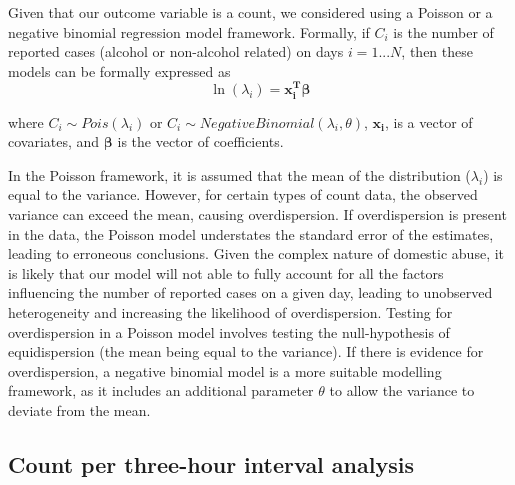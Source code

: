 \documentclass[12pt, a4paper]{article}
\newcommand{\vect}[1]{\boldsymbol{#1}}
\begin{document}
Given that our outcome variable is a count, we considered using a Poisson or a negative binomial regression model framework. 
Formally, if $C_i$ is the number of reported cases (alcohol or non-alcohol related) on days $i = 1...N$, then these models can be formally expressed as
%
\begin{equation}
 \ln(\lambda_i) =\vect{x_i^{T}}\vect{\beta}
\end{equation}


where 
$C_i \sim Pois(\lambda_i)$ or $C_i \sim Negative Binomial(\lambda_i,\theta)$, $\vect{x_i}$, is a vector of covariates, and $\boldsymbol{\beta}$ is the vector of coefficients.

In the Poisson framework, it is assumed that the mean of the distribution ($\lambda_i$) is equal to the variance. 
However, for certain types of count data, the observed variance can exceed the mean, causing overdispersion. 
If overdispersion is present in the data, the Poisson model understates the standard error of the estimates, leading to erroneous conclusions. 
Given the complex nature of domestic abuse, it is likely that our model will not able to fully account for all the factors influencing the number of reported cases on a given day, leading to unobserved heterogeneity and increasing the likelihood of overdispersion. 
Testing for overdispersion in a Poisson model involves testing the null-hypothesis of equidispersion (the mean being equal to the variance).
If there is evidence for overdispersion, a negative binomial model is a more suitable modelling framework, as it includes an additional parameter $\theta$ to allow the variance to deviate from the mean. 


\subsection{Count per three-hour interval analysis}
\end{document}
